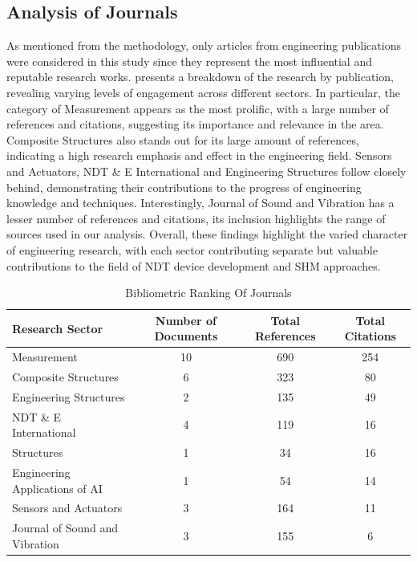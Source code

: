 \documentclass[journal, a4paper]{IEEEtran}
\begin{document}
\subsection{Analysis of Journals}
As mentioned from the methodology, only articles from engineering publications were considered in this study since they
represent the most influential and reputable research works.
\label{tbl:bibliometricRanking} presents a breakdown of the research by publication,
revealing varying levels of engagement across different sectors.
In particular, the category of Measurement appears as the most prolific,
with a large number of references and citations, suggesting its importance and relevance in the area.
Composite Structures also stands out for its large amount of references,
indicating a high research emphasis and effect in the engineering field.
Sensors and Actuators, NDT \& E International and Engineering Structures follow closely behind,
demonstrating their contributions to the progress of engineering knowledge and techniques.
Interestingly, Journal of Sound and Vibration has a lesser number of references and citations,
its inclusion highlights the range of sources used in our analysis.
Overall, these findings highlight the varied character of engineering research, with each sector contributing separate
but valuable contributions to the field of NDT device development and SHM approaches.

\begin{table}[htbp]

  \centering
  \caption{Bibliometric Ranking Of Journals}
  \label{tbl:bibliometricRanking}
  \begin{tabular}{lccc}

      \toprule
      \textbf{Research Sector} & \textbf{Number of Documents} & \textbf{Total References} & \textbf{Total Citations}  \\
      \midrule
      Measurement & 10 & 690 & 254 \\
      Composite Structures & 6 & 323 & 80 \\
      Engineering Structures & 2 & 135 & 49 \\
      NDT \& E International & 4 & 119 & 16 \\
      Structures & 1 & 34 & 16 \\
      Engineering Applications of AI & 1 & 54 & 14 \\
      Sensors and Actuators & 3 & 164 & 11 \\
      Journal of Sound and Vibration & 3 & 155 & 6 \\

      \bottomrule
  \end{tabular}
\end{table}
\end{document}

